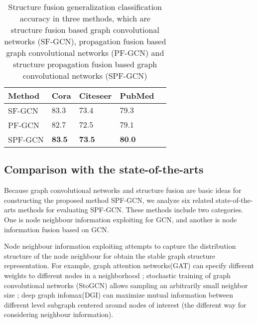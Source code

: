 \documentclass[review]{elsarticle}
\begin{document}
\begin{table}[!ht]
\small
\renewcommand{\arraystretch}{1.0}
\caption{Structure fusion generalization classification accuracy in three methods, which are structure fusion based graph convolutional networks (SF-GCN), propagation fusion based graph convolutional networks (PF-GCN) and structure propagation fusion based graph convolutional networks (SPF-GCN)}
\label{table3}
\begin{center}
\newcommand{\tabincell}[2]{\begin{tabular}{@{}#1@{}}#2\end{tabular}}
\begin{tabular}{lp{1cm}p{1cm}p{1cm}p{1cm}}
\hline
\bfseries Method &\bfseries Cora &\bfseries Citeseer &\bfseries PubMed  \\
\hline \hline
SF-GCN & $83.3$   &$73.4$ & $79.3$    \\
\hline
PF-GCN  & $82.7$   &$72.5$ & $79.1$   \\
\hline\hline
SPF-GCN  & $\textbf{83.5}$   &$\textbf{73.5}$  & $\textbf{80.0}$  \\
\hline
\end{tabular}
\end{center}
\end{table}

\subsection{Comparison with the state-of-the-arts}
\label{State-of-the-arts}
Because graph convolutional networks and structure fusion are basic ideas for constructing the proposed method SPF-GCN, we analyze six related state-of-the-arts methods for evaluating SPF-GCN. These methods include two categories. One is node neighbour information exploiting for GCN, and another is node information fusion based on GCN.

Node neighbour information exploiting attempts to capture the distribution structure of the node neighbour for obtain the stable graph structure representation. For example, graph attention networks(GAT) can specify different weights to different nodes in a neighborhood \cite{Veli2017Graph}; stochastic training of graph convolutional networks (StoGCN) allows sampling an arbitrarily small neighbor size \cite{2017arXiv171010568C}; deep graph infomax(DGI) can maximize mutual information between different level subgraph centered around nodes of interest (the different way for considering neighbour information)\cite{Veli2018Deep}.
\end{document}
